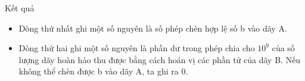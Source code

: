 Kết quả
\begin{itemize}
	\item     Dòng thứ nhất ghi một số nguyên là số phép chèn hợp lệ số b vào dãy A.   
	\item     Dòng thứ hai ghi một số nguyên là phần dư trong phép chia cho $10^{9}$    của số lượng dãy hoàn hảo thu được bằng cách hoán vị các phần tử của dãy B. Nếu không thể chèn được b vào dãy A, ta ghi ra 0.   
\end{itemize}
